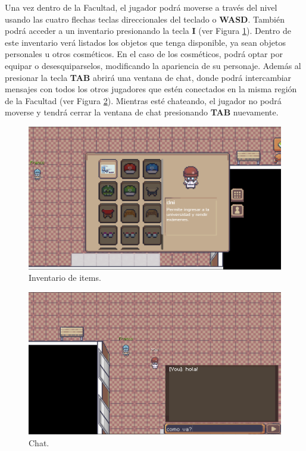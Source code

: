 Una vez dentro de la Facultad, el jugador podrá moverse a través del nivel usando las cuatro flechas teclas
direccionales del teclado o \textbf{WASD}.
También podrá acceder a un inventario presionando la tecla \textbf{I} (ver Figura \ref{fig:inventory}).
Dentro de este inventario verá listados los objetos que tenga disponible, ya sean objetos personales u otros
cosméticos. En el caso de los cosméticos, podrá optar por equipar o desesquiparselos, modificando la
apariencia de su personaje.
Además al presionar la tecla \textbf{TAB} abrirá una ventana de chat, donde podrá intercambiar mensajes con
todos los otros jugadores que estén conectados en la misma región de la Facultad (ver Figura \ref{fig:chat}).
Mientras esté chateando, el jugador no podrá moverse y tendrá cerrar la ventana de chat presionando \textbf{TAB} nuevamente.

\begin{figure}[htbp]
    \centering
    \includegraphics[width=1.0\textwidth]{../assets/godot-inventory.png}
    \caption{Inventario de items.}
    \label{fig:inventory}
\end{figure}

\begin{figure}[htbp]
    \centering
    \includegraphics[width=1.0\textwidth]{../assets/godot-chat.png}
    \caption{Chat.}
    \label{fig:chat}
\end{figure}

